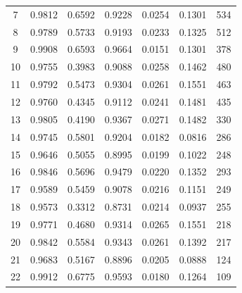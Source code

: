 \documentclass{article}
\begin{document}
\begin{table}[t]
\begin{tabular}{c r r r r r r}
7  & 0.9812 & 0.6592 & 0.9228 & 0.0254 & 0.1301 & 534 \\
8  & 0.9789 & 0.5733 & 0.9193 & 0.0233 & 0.1325 & 512 \\
9  & 0.9908 & 0.6593 & 0.9664 & 0.0151 & 0.1301 & 378 \\
10 & 0.9755 & 0.3983 & 0.9088 & 0.0258 & 0.1462 & 480 \\
11 & 0.9792 & 0.5473 & 0.9304 & 0.0261 & 0.1551 & 463 \\
12 & 0.9760 & 0.4345 & 0.9112 & 0.0241 & 0.1481 & 435 \\
13 & 0.9805 & 0.4190 & 0.9367 & 0.0271 & 0.1482 & 330 \\
14 & 0.9745 & 0.5801 & 0.9204 & 0.0182 & 0.0816 & 286 \\
15 & 0.9646 & 0.5055 & 0.8995 & 0.0199 & 0.1022 & 248 \\
16 & 0.9846 & 0.5696 & 0.9479 & 0.0220 & 0.1352 & 293 \\
17 & 0.9589 & 0.5459 & 0.9078 & 0.0216 & 0.1151 & 249 \\
18 & 0.9573 & 0.3312 & 0.8731 & 0.0214 & 0.0937 & 255 \\
19 & 0.9771 & 0.4680 & 0.9314 & 0.0265 & 0.1551 & 218 \\
20 & 0.9842 & 0.5584 & 0.9343 & 0.0261 & 0.1392 & 217 \\
21 & 0.9683 & 0.5167 & 0.8896 & 0.0205 & 0.0888 & 124 \\
22 & 0.9912 & 0.6775 & 0.9593 & 0.0180 & 0.1264 & 109 \\
\bottomrule
\end{tabular}
\end{table}
\end{document}
